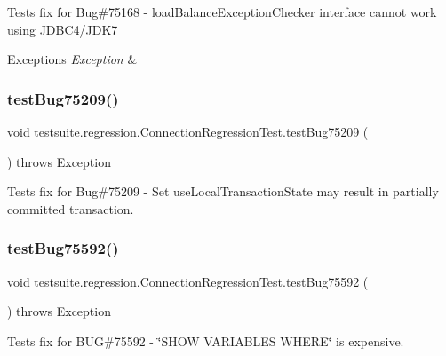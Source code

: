 Tests fix for Bug\#75168 -\/ load\+Balance\+Exception\+Checker interface cannot work using J\+D\+B\+C4/\+J\+D\+K7


\begin{DoxyExceptions}{Exceptions}
{\em Exception} & \\
\hline
\end{DoxyExceptions}
\mbox{\label{classtestsuite_1_1regression_1_1_connection_regression_test_a0cc242ab6f5c5f0c1bb19d14d37bb866}} 
\subsubsection{\texorpdfstring{test\+Bug75209()}{testBug75209()}}
{\footnotesize\ttfamily void testsuite.\+regression.\+Connection\+Regression\+Test.\+test\+Bug75209 (\begin{DoxyParamCaption}{ }\end{DoxyParamCaption}) throws Exception}

Tests fix for Bug\#75209 -\/ Set use\+Local\+Transaction\+State may result in partially committed transaction. \mbox{\label{classtestsuite_1_1regression_1_1_connection_regression_test_a665407a24ed690a64058e8f86c4d6063}} 
\subsubsection{\texorpdfstring{test\+Bug75592()}{testBug75592()}}
{\footnotesize\ttfamily void testsuite.\+regression.\+Connection\+Regression\+Test.\+test\+Bug75592 (\begin{DoxyParamCaption}{ }\end{DoxyParamCaption}) throws Exception}

Tests fix for B\+UG\#75592 -\/ \char`\"{}\+S\+H\+O\+W V\+A\+R\+I\+A\+B\+L\+E\+S W\+H\+E\+R\+E\char`\"{} is expensive.


